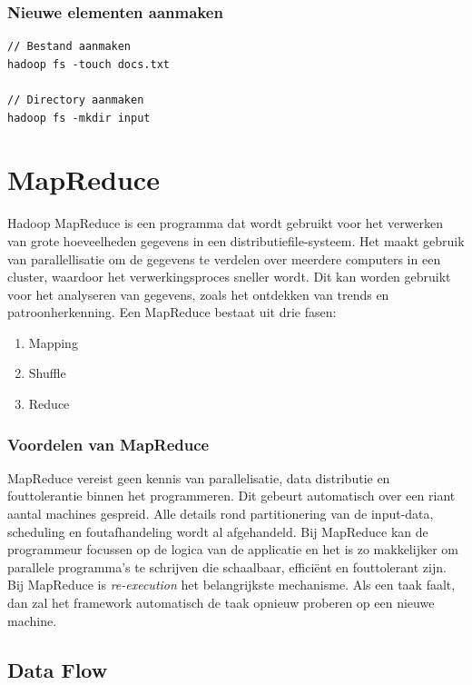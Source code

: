 \documentclass[a4paper,10pt,twoside]{report}
\begin{document}
\subsubsection{Nieuwe elementen aanmaken}
\begin{lstlisting}
// Bestand aanmaken
hadoop fs -touch docs.txt

// Directory aanmaken
hadoop fs -mkdir input
\end{lstlisting}

\section{MapReduce}

Hadoop MapReduce is een programma dat wordt gebruikt voor het verwerken van grote hoeveelheden gegevens in een distributiefile-systeem. Het maakt gebruik van parallellisatie om de gegevens te verdelen over meerdere computers in een cluster, waardoor het verwerkingsproces sneller wordt. Dit kan worden gebruikt voor het analyseren van gegevens, zoals het ontdekken van trends en patroonherkenning. Een MapReduce bestaat uit drie fasen:

\begin{enumerate}
	\item Mapping
	\item Shuffle
	\item Reduce
\end{enumerate}

\subsubsection{Voordelen van MapReduce}

MapReduce vereist geen kennis van parallelisatie, data distributie en fouttolerantie binnen het programmeren. Dit gebeurt automatisch over een riant aantal machines gespreid. Alle details rond partitionering van de input-data, scheduling en foutafhandeling wordt al afgehandeld. Bij MapReduce kan de programmeur focussen op de logica van de applicatie en het is zo makkelijker om parallele programma's te schrijven die schaalbaar, efficiënt en fouttolerant zijn. Bij MapReduce is \textit{re-execution} het belangrijkste mechanisme. Als een taak faalt, dan zal het framework automatisch de taak opnieuw proberen op een nieuwe machine.

\subsection{Data Flow}
\end{document}
